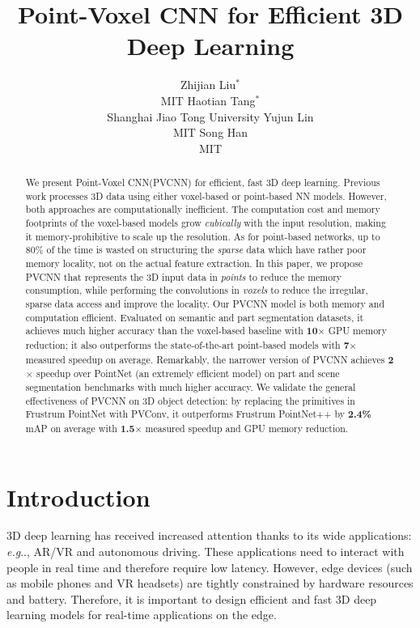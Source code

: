 \documentclass{article}
\title{Point-Voxel CNN for Efficient 3D Deep Learning}
\author{Zhijian Liu$^{*}$\\
MIT
\And
Haotian Tang$^{*}$\\
Shanghai Jiao Tong University
\And
Yujun Lin\\
MIT
\And
Song Han\\
MIT
}
\makeatletter
\DeclareRobustCommand\onedot{\futurelet\@let@token\@onedot}
\def\@onedot{\ifx\@let@token.\else.\null\fi\xspace}
\def\eg{\emph{e.g}\onedot} \def\Eg{\emph{E.g}\onedot}
\def\model{Point-Voxel CNN\xspace}
\def\modelshort{PVCNN\xspace}
\def\convshort{PVConv\xspace}
\makeatother
\begin{document}
\maketitle


\begin{abstract}

We present \model (\modelshort) for efficient, fast 3D deep learning. Previous work processes 3D data using either voxel-based or point-based NN models. However, both approaches are computationally inefficient. The computation cost and memory footprints of the voxel-based models grow \textit{cubically} with the input resolution, making it memory-prohibitive to scale up the resolution. As for point-based networks, up to 80\% of the time is wasted on structuring the \textit{sparse} data which have rather poor memory locality, not on the actual feature extraction. In this paper, we propose \modelshort that represents the 3D input data in \textit{points} to reduce the memory consumption, while performing the convolutions in \textit{voxels} to reduce the irregular, sparse data access and improve the locality. Our \modelshort model is both memory and computation efficient. Evaluated on semantic and part segmentation datasets, it achieves much higher accuracy than the voxel-based baseline with \textbf{10$\times$} GPU memory reduction; it also outperforms the state-of-the-art point-based models with \textbf{7$\times$} measured speedup on average. Remarkably, the narrower version of \modelshort achieves \textbf{2$\times$} speedup over PointNet (an extremely efficient model) on part and scene segmentation benchmarks with much higher accuracy. We validate the general effectiveness of \modelshort on 3D object detection: by replacing the primitives in Frustrum PointNet with \convshort, it outperforms Frustrum PointNet++ by \textbf{2.4\%} mAP on average with \textbf{1.5$\times$} measured speedup and GPU memory reduction.

\end{abstract} \section{Introduction}
\label{sec:intro}

3D deep learning has received increased attention thanks to its wide applications: \eg, AR/VR and autonomous driving. These applications need to interact with people in real time and therefore require low latency. However, edge devices (such as mobile phones and VR headsets) are tightly constrained by hardware resources and battery. Therefore, it is important to design efficient and fast 3D deep learning models for real-time applications on the edge.
\end{document}

